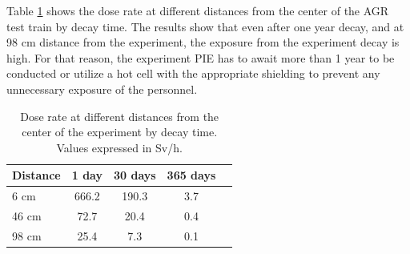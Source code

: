 

Table \ref{table:agr-dose} shows the dose rate at different distances from the center of the AGR test train by decay time.
The results show that even after one year decay, and at 98 cm distance from the experiment, the exposure from the experiment decay is high.
For that reason, the experiment \gls*{PIE} has to await more than 1 year to be conducted or utilize a hot cell with the appropriate shielding to prevent any unnecessary exposure of the personnel.

\begin{table}[!htb]
  \centering
  \caption{Dose rate at different distances from the center of the experiment by decay time. Values expressed in Sv/h.}
  \label{table:agr-dose} 
  \begin{tabular}{lcccc}
  \toprule
  Distance   & 1 day        & 30 days        & 365 days      \\
  \midrule
  6 cm       & 666.2         & 190.3          & 3.7           \\
  46 cm      & 72.7          & 20.4           & 0.4           \\
  98 cm      & 25.4          & 7.3            & 0.1           \\
  \bottomrule
\end{tabular}
\end{table}


